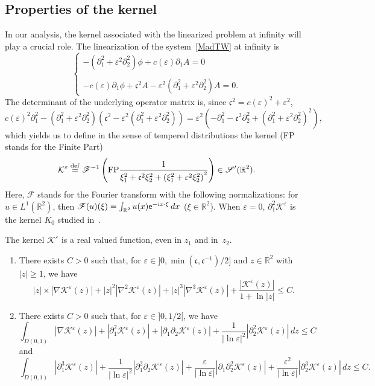 \documentclass[AHL,Unicode,longabstracts,published]{cedram}
\newcommand*\p{\partial}
\newcommand*\R{\mathbb R}
\newcommand*\ddef{\stackrel{\rm def}{=}}
\newcommand{\FP}{\mathrm{FP}}
\newcommand*\BK{\mathcal{K}}
\newcommand*\ds{\displaystyle}
\newcommand*\ex{{\sf e}}
\newcommand*\Fou{\mathscr{F}}
\newcommand*\Sch{\mathscr{S}}
\newcommand*\cs{{\mathfrak c}}
\newcommand*\gs{\geqslant }
\newcommand*\ls{\leqslant }
\newcommand*\e{\varepsilon}
\newcommand*\lne{\lvert \ln \varepsilon \rvert}
\newcommand*{\romanenumi}{\renewcommand*{\theenumi}{\roman{enumi}}}
\begin{document}
\subsection{Properties of the kernel}

In our analysis, the kernel associated with the linearized problem at infinity will play a crucial role. The linearization of the system~\eqref{MadTW} at infinity is
\begin{equation*}
\left\{
\begin{array}{ll}
\ds{ - \left(\p_{1}^2 + \e^2 \p^2_{2}\right) \phi + c(\e) \p_{1} A } = 0 \\ \ \\
\ds{ - c(\e) \p_{1} \phi + \cs^2 A - \e^2 \left(\p_{1}^2 + \e^2 \p_{2}^2\right) A = 0.}
\end{array}\right.
\end{equation*}
The determinant of the underlying operator matrix is, since $ \cs^2 = c(\e)^2 + \e^2 $,
\[
c(\e)^2 \p_{1}^2 - \left(\p_{1}^2 + \e^2 \p_{2}^2\right) \left(\cs^2 - \e^2 \left(\p_{1}^2 + \e^2 \p_{2}^2\right) \right) = \e^2 \left(- \p_1^2 - \cs^2 \p_{2}^2 + \left(\p_{1}^2 + \e^2 \p_{2}^2\right)^2 \right),
\]
which yields us to define in the sense of tempered distributions the kernel (FP stands for the Finite Part)
\begin{equation}\label{defkernel}
\BK^\e \ddef \Fou^{-1} \left(
\FP \frac{1}{ \xi_1^2 + \cs^2 \xi_2^2 + \left(\xi_1^2 + \e^2 \xi_2^2\right)^2 } \right)
\in \Sch'(\R^2).
\end{equation}
Here, $ \Fou $ stands for the Fourier transform with the following normalizations: for $ u \in L^1 (\R^2) $, then $ \Fou (u) (\xi) = \int_{\R^2} u(x) \ex^{-i x\cdot \xi } \, dx $ ($\xi \in \R^2 $). When $ \e = 0 $, $ \p_1^2 \BK^\e $ is the kernel $ K_0 $ studied in~\cite{Gravos}.


\begin{prop}\label{noyaux}
The kernel $ \BK^\e $ is a real valued function, even in $z_1 $ and in~$ z_2 $.
\begin{enumerate}\romanenumi
\item\label{prop2.3.1} There exists $ C > 0 $ such that, for $ \e \in]0, \min(\cs,\cs^{-1}) /2] $ and $ z \in \R^2 $ with $ | z | \gs 1 $, we have
\[
|z| \times \left|\nabla \BK^\e (z) \right| + |z|^2 \left|\nabla^2 \BK^\e (z) \right| + |z|^3 \left|\nabla^3 \BK^\e (z)\right| + \frac{\left| \BK^\e (z)\right|}{1 + \ln |z|}
\ls C.
\]
\item\label{prop2.3.2} There exists $ C > 0 $ such that, for $ \e \in] 0,1/2 [$, we have
\[
\int_{D(0,1)} \left\lvert \nabla \BK^\e (z) \right\rvert + \left\lvert \p_1^2 \BK^\e (z) \right\rvert + \left\lvert \p_1\p_2 \BK^\e (z) \right\rvert + \frac{1}{ \lne^2 } \left\lvert \p_2^2 \BK^\e (z) \right\rvert \, dz
\ls C
\]
and
\[
\int_{D(0,1)} \left\lvert \p_1^3 \BK^\e (z) \right\rvert + \frac{1}{ \lne^2} \left\lvert \p_1^2 \p_2 \BK^\e (z) \right\rvert + \frac{\e }{ \lne } \left\lvert \p_1 \p_2^2 \BK^\e (z) \right\rvert + \frac{\e^2}{ \lvert \ln \e \rvert } \left\lvert \p_2^3 \BK^\e (z) \right\rvert \, dz
\ls C.
\]
\end{enumerate}
\end{prop}
\end{document}
